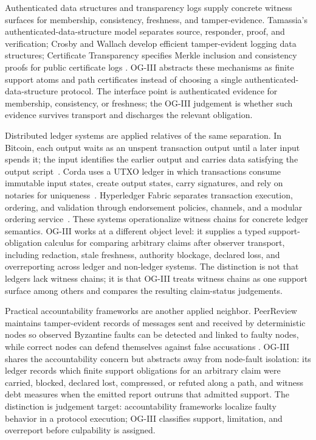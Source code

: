 \documentclass[11pt,twoside]{article}
\theoremstyle{definition}
\begin{document}
Authenticated data structures and transparency logs supply concrete witness
surfaces for membership, consistency, freshness, and tamper-evidence. Tamassia's
authenticated-data-structure model separates source, responder, proof, and
verification; Crosby and Wallach develop efficient tamper-evident logging data
structures; Certificate Transparency specifies Merkle inclusion and consistency
proofs for public certificate logs
\cite{tamassia_authenticated_data_2003,crosby_wallach_tamper_logging_2009,rfc9162}.
OG-III abstracts these mechanisms as finite support atoms and path certificates
instead of choosing a single authenticated-data-structure protocol. The
interface point is authenticated evidence for membership, consistency, or
freshness; the OG-III judgement is whether such evidence survives transport and
discharges the relevant obligation.

Distributed ledger systems are applied relatives of the same separation. In
Bitcoin, each output waits as an unspent transaction output until a later input
spends it; the input identifies the earlier output and carries data satisfying
the output script~\cite{bitcoin_dev_transactions_2026}. Corda uses a UTXO
ledger in which transactions consume immutable input states, create output
states, carry signatures, and rely on notaries for
uniqueness~\cite{r3_corda_transactions_2026}. Hyperledger Fabric separates
transaction execution, ordering, and validation through endorsement policies,
channels, and a modular ordering
service~\cite{androulaki_fabric_2018,hyperledger_fabric_docs_2026}. These
systems operationalize witness chains for concrete ledger semantics. OG-III
works at a different object level: it supplies a typed support-obligation
calculus for comparing arbitrary claims after observer transport, including
redaction, stale freshness, authority blockage, declared loss, and overreporting
across ledger and non-ledger systems. The distinction is not that ledgers lack
witness chains; it is that OG-III treats witness chains as one support surface
among others and compares the resulting claim-status judgements.

Practical accountability frameworks are another applied neighbor. PeerReview
maintains tamper-evident records of messages sent and received by deterministic
nodes so observed Byzantine faults can be detected and linked to faulty nodes,
while correct nodes can defend themselves against false accusations
\cite{haeberlen_peerreview_2007}. OG-III shares the accountability concern but
abstracts away from node-fault isolation: its ledger records which finite
support obligations for an arbitrary claim were carried, blocked, declared lost,
compressed, or refuted along a path, and witness debt measures when the emitted
report outruns that admitted support. The distinction is judgement target:
accountability frameworks localize faulty behavior in a protocol execution;
OG-III classifies support, limitation, and overreport before culpability is
assigned.
\end{document}
